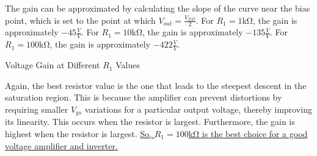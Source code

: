 \FloatBarrier

The gain can be approximated by calculating the slope of the curve near the bias point, which is set to the point at which $V_{out} = \frac{V_{DD}}{2}$. For $R_1 = 1$\si{\kilo\ohm}, the gain is approximately $-45 \frac{V}{V}$. For $R_1 = 10$\si{\kilo\ohm}, the gain is approximately $-135 \frac{V}{V}$. For $R_1 = 100$\si{\kilo\ohm}, the gain is approximately $-422 \frac{V}{V}$. \\

\FloatBarrier

\begin{table}[h!]
	\centering
	\caption{Voltage Gain at Different $R_1$ Values}
	\label{tab:gain}
\end{table}

\FloatBarrier

Again, the best resistor value is the one that leads to the steepest descent in the saturation region. This is because the amplifier can prevent distortions by requiring smaller $V_{gs}$ variations for a particular output voltage, thereby improving its linearity. This occurs when the resistor is largest. Furthermore, the gain is highest when the resistor is largest. \uline{So, $R_1 = 100$\si{\kilo\ohm} is the best choice for a good voltage amplifier and inverter.} \\
